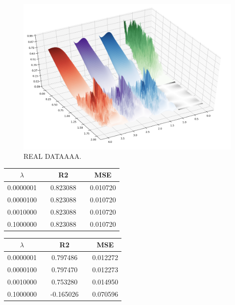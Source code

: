 \begin{figure}[H]
		\centering
		\includegraphics[width=1.1\linewidth]{result/bilder/all_real.png}
		\caption{REAL DATAAAA.}
		\label{fig:RealData}
\end{figure}


 \begin{center}
 \label{tab:Realdata_OLS_lambda_R2_MSE}
 \begin{tabularx}{\textwidth}{c X c X c  }
     \hline
     \hline
$\lambda$    &&R2     &&MSE     \\
         \hline
0.0000001 && 0.823088 && 0.010720 \\
0.0000100 && 0.823088 && 0.010720 \\
0.0010000 && 0.823088 && 0.010720 \\
0.1000000 && 0.823088 && 0.010720 \\
 \end{tabularx}
 \end{center}

 \begin{center}
 \label{tab:Realdata_Lasso_lambda_R2_MSE}
 \begin{tabularx}{\textwidth}{c X c X c  }
     \hline
     \hline
$\lambda$    &&R2     &&MSE     \\
         \hline
0.0000001 && 0.797486 && 0.012272 \\
0.0000100 && 0.797470 && 0.012273 \\
0.0010000 && 0.753280 && 0.014950 \\
0.1000000 && -0.165026 && 0.070596 \\
 \end{tabularx}
 \end{center}

